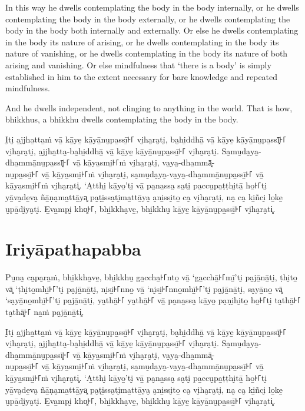 In this way he dwells contemplating the body in the body internally, or he
dwells contemplating the body in the body externally, or he dwells contemplating
the body in the body both internally and externally. Or else he dwells
contemplating in the body its nature of arising, or he dwells contemplating in
the body its nature of vanishing, or he dwells contemplating in the body its
nature of both arising and vanishing. Or else mindfulness that ‘there is a body’
is simply established in him to the extent necessary for bare knowledge and
repeated mindfulness.

And he dwells independent, not clinging to anything in the world. That is how,
bhikkhus, a bhikkhu dwells contemplating the body in the body.


\paliPage

I̮ti̮ a̱jjha̱tta̱ṁ vā̱ kā̱ye̱ kā̱yā̱nu̮pa̱ssī̱꜔꜒ vi̮ha̮ra̮ti̮, ba̮hi̱ddhā̱ vā̱ kā̱ye̱ kā̱yā̱nu̮pa̱ssī͓꜔꜒
vi̮ha̮ra̮ti̮, a̱jjha̱tta̮-ba̮hi̱ddhā̱ vā̱ kā̱ye̱ kā̱yā̱nu̮pa̱ssī̱꜔꜒ vi̮ha̮ra̮ti̮. Sa̮mu̮da̮ya̮-dha̱mmā̱nu̮pa̱ssī͓꜔꜒
vā̱ kā̱ya̱smi̱꜔꜒ṁ vi̮ha̮ra̮ti̮, va̮ya̮-dha̱mmā͓-\\
nu̮pa̱ssī̱꜔꜒ vā̱ kā̱ya̱smi̱꜔꜒ṁ vi̮ha̮ra̮ti̮, sa̮mu̮da̮ya̮-va̮ya̮-dha̱mmā̱nu̮pa̱ssī̱꜔꜒ vā̱ kā̱ya̱smi̱꜔꜒ṁ vi̮ha̮ra̮ti͓.
‘A̱tthi̮ kā̱yo̱’ti̮ vā̱ pa̮na̱ssa̮ sa̮ti̮ pa̱ccu̮pa̱ṭṭhi̮tā̱ ho̱꜔꜒ti̮ yā̱va̮de̱va̮ ñā̱ṇa̮ma̱ttā̱ya͓
pa̮ṭi̱ssa̮ti̮ma̱ttā̱ya̮ a̮ni̱ssi̮to̱ ca̮ vi̮ha̮ra̮ti̮, na̮ ca̮ ki̱ñci̮ lo̱ke̱ u̮pā̱di̮ya̮ti̮. E̱va̱mpi̮ kho͓꜔꜒,
bhi̱kkha̮ve̱, bhi̱kkhu̮ kā̱ye̱ kā̱yā̱nu̮pa̱ssī̱꜔꜒ vi̮ha̮ra̮ti͓.


\section*{Iriyāpathapabba}

Pu̮na̮ ca̮pa̮ra̱ṁ, bhi̱kkha̮ve̱, bhi̱kkhu̮ ga̱ccha̱꜔꜒nto̱ vā̱ ‘ga̱cchā̱꜔꜒mī̱’ti̮ pa̮jā̱nā̱ti̮, ṭhi̮to̱ vā͓
‘ṭhi̮to̱mhī̱꜔꜒’ti̮ pa̮jā̱nā̱ti̮, ni̮si̱꜔꜒nno̱ vā̱ ‘ni̮si̱꜔꜒nno̱mhī̱꜔꜒’ti̮ pa̮jā̱nā̱ti̮, sa̮yā̱no̱ vā͓
‘sa̮yā̱no̱mhī̱꜔꜒’ti̮ pa̮jā̱nā̱ti̮, ya̮thā̱꜔꜒ ya̮thā̱꜔꜒ vā̱ pa̮na̱ssa̮ kā̱yo̱ pa̮ṇi̮hi̮to̱ ho̱꜔꜒ti̮ ta̮thā̱꜔꜒ ta̮thā͓꜔꜒
na̱ṁ pa̮jā̱nā̱ti͓.

I̮ti̮ a̱jjha̱tta̱ṁ vā̱ kā̱ye̱ kā̱yā̱nu̮pa̱ssī̱꜔꜒ vi̮ha̮ra̮ti̮, ba̮hi̱ddhā̱ vā̱ kā̱ye̱ kā̱yā̱nu̮pa̱ssī͓꜔꜒
vi̮ha̮ra̮ti̮, a̱jjha̱tta̮-ba̮hi̱ddhā̱ vā̱ kā̱ye̱ kā̱yā̱nu̮pa̱ssī̱꜔꜒ vi̮ha̮ra̮ti̮. Sa̮mu̮da̮ya̮-dha̱mmā̱nu̮pa̱ssī͓꜔꜒
vā̱ kā̱ya̱smi̱꜔꜒ṁ vi̮ha̮ra̮ti̮, va̮ya̮-dha̱mmā͓-\\
nu̮pa̱ssī̱꜔꜒ vā̱ kā̱ya̱smi̱꜔꜒ṁ vi̮ha̮ra̮ti̮, sa̮mu̮da̮ya̮-va̮ya̮-dha̱mmā̱nu̮pa̱ssī̱꜔꜒ vā̱ kā̱ya̱smi̱꜔꜒ṁ vi̮ha̮ra̮ti͓.
‘A̱tthi̮ kā̱yo̱’ti̮ vā̱ pa̮na̱ssa̮ sa̮ti̮ pa̱ccu̮pa̱ṭṭhi̮tā̱ ho̱꜔꜒ti̮ yā̱va̮de̱va̮ ñā̱ṇa̮ma̱ttā̱ya͓
pa̮ṭi̱ssa̮ti̮ma̱ttā̱ya̮ a̮ni̱ssi̮to̱ ca̮ vi̮ha̮ra̮ti̮, na̮ ca̮ ki̱ñci̮ lo̱ke̱ u̮pā̱di̮ya̮ti̮. E̱va̱mpi̮ kho͓꜔꜒,
bhi̱kkha̮ve̱, bhi̱kkhu̮ kā̱ye̱ kā̱yā̱nu̮pa̱ssī̱꜔꜒ vi̮ha̮ra̮ti͓.


